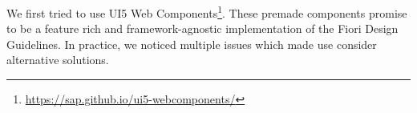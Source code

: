We first tried to use UI5 Web Components\footnote{\url{https://sap.github.io/ui5-webcomponents/}}. These premade components promise to be a feature rich and framework-agnostic implementation of the Fiori Design Guidelines. In practice, we noticed multiple issues which made use consider alternative solutions. 



